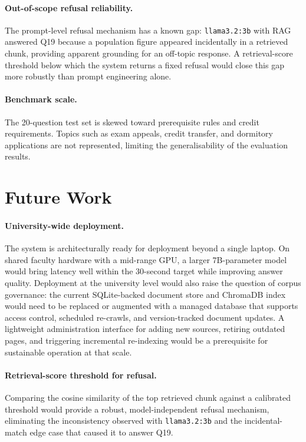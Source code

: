 \paragraph{Out-of-scope refusal reliability.}
The prompt-level refusal mechanism has a known gap: \texttt{llama3.2:3b} with
RAG answered Q19 because a population figure appeared incidentally in a
retrieved chunk, providing apparent grounding for an off-topic response. A
retrieval-score threshold below which the system returns a fixed refusal would
close this gap more robustly than prompt engineering alone.

\paragraph{Benchmark scale.}
The 20-question test set is skewed toward prerequisite rules and credit
requirements. Topics such as exam appeals, credit transfer, and dormitory
applications are not represented, limiting the generalisability of the
evaluation results.

\section{Future Work}
\label{sec:sum-future}

\paragraph{University-wide deployment.}
The system is architecturally ready for deployment beyond a single laptop. On
shared faculty hardware with a mid-range GPU, a larger 7B-parameter model
would bring latency well within the 30-second target while improving answer
quality. Deployment at the university level would also raise the question of
corpus governance: the current SQLite-backed document store and ChromaDB index
would need to be replaced or augmented with a managed database that supports
access control, scheduled re-crawls, and version-tracked document updates. A
lightweight administration interface for adding new sources, retiring outdated
pages, and triggering incremental re-indexing would be a prerequisite for
sustainable operation at that scale.

\paragraph{Retrieval-score threshold for refusal.}
Comparing the cosine similarity of the top retrieved chunk against a calibrated
threshold would provide a robust, model-independent refusal mechanism,
eliminating the inconsistency observed with \texttt{llama3.2:3b} and the
incidental-match edge case that caused it to answer Q19.

